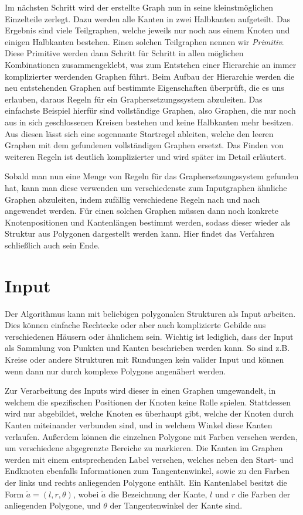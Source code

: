 Im nächsten Schritt wird der erstellte Graph nun in seine kleinstmöglichen Einzelteile zerlegt. Dazu werden alle Kanten in zwei Halbkanten
aufgeteilt. Das Ergebnis sind viele Teilgraphen, welche jeweils nur noch aus einem Knoten und einigen Halbkanten bestehen. Einen solchen Teilgraphen
nennen wir \textit{Primitiv}. Diese Primitive werden dann Schritt für Schritt in allen möglichen Kombinationen zusammengeklebt, was zum Entstehen
einer Hierarchie an immer komplizierter werdenden Graphen führt. Beim Aufbau der Hierarchie werden die neu entstehenden Graphen auf bestimmte
Eigenschaften überprüft, die es uns erlauben, daraus Regeln für ein Graphersetzungssystem abzuleiten. Das einfachste Beispiel hierfür sind
vollständige Graphen, also Graphen, die nur noch aus in sich geschlossenen Kreisen bestehen und keine Halbkanten mehr besitzen. Aus diesen lässt
sich eine sogennante Startregel ableiten, welche den leeren Graphen mit dem gefundenen vollständigen Graphen ersetzt. Das Finden von weiteren
Regeln ist deutlich komplizierter und wird später im Detail erläutert.


Sobald man nun eine Menge von Regeln für das Graphersetzungssystem gefunden hat, kann man diese verwenden um verschiedenste zum Inputgraphen
ähnliche Graphen abzuleiten, indem zufällig verschiedene Regeln nach und nach angewendet werden. Für einen solchen Graphen müssen dann noch
konkrete Knotenpositionen und Kantenlängen bestimmt werden, sodass dieser wieder als Struktur aus Polygonen dargestellt werden kann. Hier
findet das Verfahren schließlich auch sein Ende.

\section{Input}
Der Algorithmus kann mit beliebigen polygonalen Strukturen als Input arbeiten. Dies können einfache Rechtecke oder aber auch komplizierte Gebilde
aus verschiedenen Häusern oder ähnlichem sein. Wichtig ist lediglich, dass der Input als Sammlung von Punkten und Kanten beschrieben werden kann.
So sind z.B. Kreise oder andere Strukturen mit Rundungen kein valider Input und können wenn dann nur durch komplexe Polygone angenähert werden.

Zur Verarbeitung des Inputs wird dieser in einen Graphen umgewandelt, in welchem die spezifischen Positionen der Knoten keine Rolle spielen.
Stattdessen wird nur abgebildet, welche Knoten es überhaupt gibt, welche der Knoten durch Kanten miteinander verbunden sind, und in welchem Winkel
diese Kanten verlaufen. Außerdem können die einzelnen Polygone mit Farben versehen werden, um verschiedene abgegrenzte Bereiche zu markieren.
Die Kanten im Graphen werden mit einem entsprechenden Label versehen, welches neben den Start- und Endknoten ebenfalls Informationen zum
Tangentenwinkel, sowie zu den Farben der links und rechts anliegenden Polygone enthält. Ein Kantenlabel besitzt die Form
\(\tilde{a} = (l,r,\theta)\), wobei \(\tilde{a}\) die Bezeichnung der Kante, \(l\) und \(r\) die Farben der anliegenden Polygone, und
\(\theta\) der Tangentenwinkel der Kante sind.

